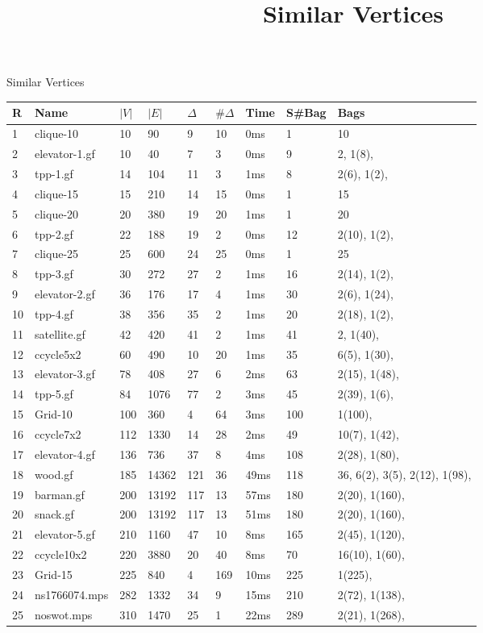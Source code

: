 \documentclass{article}
\title{Similar Vertices}
\begin{document}
\maketitle
Similar Vertices
\begin{longtable}{|l |l |l |l |l |l |l |l |l |}
\hline
R&Name&$|V|$&$|E|$&$\Delta$&$\# \Delta$&Time&S\#Bag&Bags\\
\hline
1&clique-10&10&90&9&10&0ms&1&10\\
2&elevator-1.gf&10&40&7&3&0ms&9&2, 1(8), \\
3&tpp-1.gf&14&104&11&3&1ms&8&2(6), 1(2), \\
4&clique-15&15&210&14&15&0ms&1&15\\
5&clique-20&20&380&19&20&1ms&1&20\\
6&tpp-2.gf&22&188&19&2&0ms&12&2(10), 1(2), \\
7&clique-25&25&600&24&25&0ms&1&25\\
8&tpp-3.gf&30&272&27&2&1ms&16&2(14), 1(2), \\
9&elevator-2.gf&36&176&17&4&1ms&30&2(6), 1(24), \\
10&tpp-4.gf&38&356&35&2&1ms&20&2(18), 1(2), \\
11&satellite.gf&42&420&41&2&1ms&41&2, 1(40), \\
12&ccycle5x2&60&490&10&20&1ms&35&6(5), 1(30), \\
13&elevator-3.gf&78&408&27&6&2ms&63&2(15), 1(48), \\
14&tpp-5.gf&84&1076&77&2&3ms&45&2(39), 1(6), \\
15&Grid-10&100&360&4&64&3ms&100&1(100), \\
16&ccycle7x2&112&1330&14&28&2ms&49&10(7), 1(42), \\
17&elevator-4.gf&136&736&37&8&4ms&108&2(28), 1(80), \\
18&wood.gf&185&14362&121&36&49ms&118&36, 6(2), 3(5), 2(12), 1(98), \\
19&barman.gf&200&13192&117&13&57ms&180&2(20), 1(160), \\
20&snack.gf&200&13192&117&13&51ms&180&2(20), 1(160), \\
21&elevator-5.gf&210&1160&47&10&8ms&165&2(45), 1(120), \\
22&ccycle10x2&220&3880&20&40&8ms&70&16(10), 1(60), \\
23&Grid-15&225&840&4&169&10ms&225&1(225), \\
24&ns1766074.mps&282&1332&34&9&15ms&210&2(72), 1(138), \\
25&noswot.mps&310&1470&25&1&22ms&289&2(21), 1(268), \\

\end{longtable}
\end{document}
